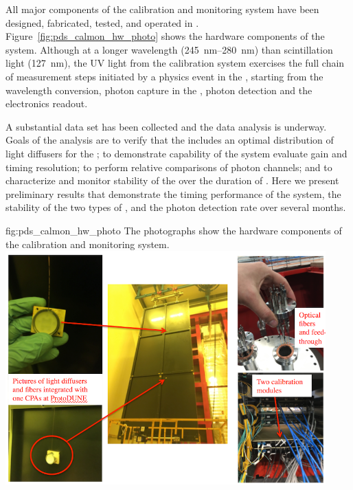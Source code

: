 All major components of the   calibration and monitoring system have been designed, fabricated, tested, and operated in . Figure~\ref{fig:pds_calmon_hw_photo} shows the hardware components of the system.
Although at a longer wavelength (\SIrange{245}{280}{nm}) than \lar scintillation light (\SI{127}{nm}), the UV light from the calibration system exercises the full chain of measurement steps initiated by a physics event in the , starting from the wavelength conversion, photon capture in the , photon detection and the  electronics readout.

A substantial  data set has been collected and the data analysis is underway. 
Goals of the analysis are to verify that the  includes an optimal distribution of light diffusers for the ;
to demonstrate capability of the system evaluate gain and timing resolution; to perform relative comparisons of photon channels;
and to characterize and monitor stability of the  over the duration of . Here we present preliminary results that demonstrate the timing performance of the system, the stability of the two types of , and the photon detection rate over several months.


\begin{dunefigure}
 {fig:pds_calmon_hw_photo}
 {The photographs show the hardware components of the  calibration and monitoring system.}
 \includegraphics[angle=0, height=9cm]{graphics/pds-calmon-fig2.png}
\end{dunefigure}


